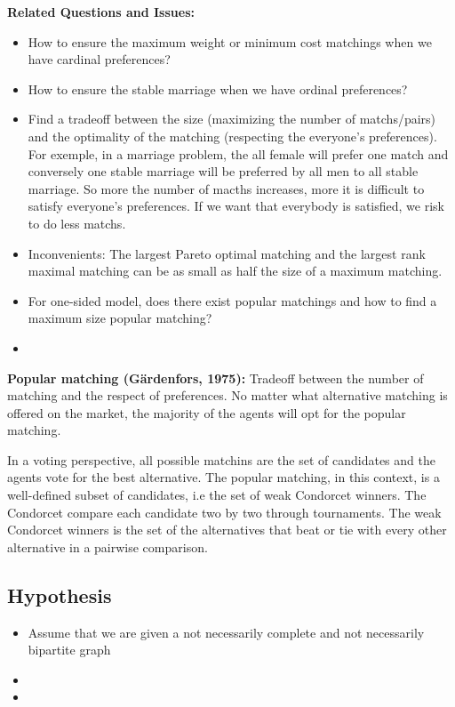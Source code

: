 \documentclass[12pt,a4paper]{article}
\begin{document}
\textbf{Related Questions and Issues:}
\begin{itemize}
    \item How to ensure the maximum weight or minimum cost matchings when we have cardinal preferences?
    \item How to ensure the stable marriage when we have ordinal preferences?
    \item Find a tradeoff between the size (maximizing the number of matchs/pairs) and the optimality of the matching (respecting the everyone's preferences). For exemple, in a marriage problem, the all female will prefer one match and conversely one stable marriage will be preferred by all men to all stable marriage. So more the number of macths increases, more it is difficult to satisfy everyone's preferences. If we want that everybody is satisfied, we risk to do less matchs.
    \item Inconvenients: The largest Pareto optimal matching and the largest rank maximal matching can be as small as half the size of a maximum matching.
    \item For one-sided model, does there exist popular matchings and how to find a maximum size popular matching?
    \item 
\end{itemize}

\textbf{Popular matching (Gärdenfors, 1975):} 
Tradeoff between the number of matching and the respect of preferences. 
No matter what alternative matching is offered on the market, the majority of the agents will opt for the popular matching.

In a voting perspective, all possible matchins are the set of candidates and the agents vote for the best alternative.
The popular matching, in this context, is a well-defined subset of candidates, i.e the set of weak Condorcet winners.
The Condorcet compare each candidate two by two through tournaments. 
The weak Condorcet winners is the set of the alternatives that beat or tie with every other alternative in a pairwise comparison.

\subsection*{Hypothesis}
\begin{itemize}
    \item Assume that we are given a not necessarily complete and not necessarily bipartite graph
    \item 
    \item 
\end{itemize}
\end{document}
